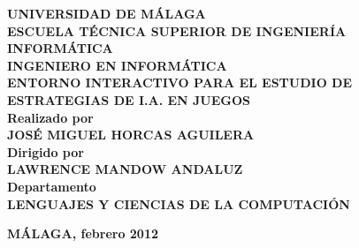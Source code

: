 \begin{center}
\bfseries
UNIVERSIDAD DE MÁLAGA
\\
\bigskip
ESCUELA TÉCNICA SUPERIOR DE INGENIERÍA INFORMÁTICA
\\
\bigskip
INGENIERO EN INFORMÁTICA
\\
\bigskip
ENTORNO INTERACTIVO PARA EL ESTUDIO DE ESTRATEGIAS DE I.A. EN JUEGOS
\\
\bigskip
\textmd{Realizado por}
\\
JOSÉ MIGUEL HORCAS AGUILERA
\\
\bigskip
\textmd{Dirigido por}
\\
LAWRENCE MANDOW ANDALUZ
\\
\bigskip
\textmd{Departamento}
\\
LENGUAJES Y CIENCIAS DE LA COMPUTACIÓN
\\
\bigskip
\end{center}

\begin{flushright}
\textbf{MÁLAGA, febrero 2012}
\end{flushright}
